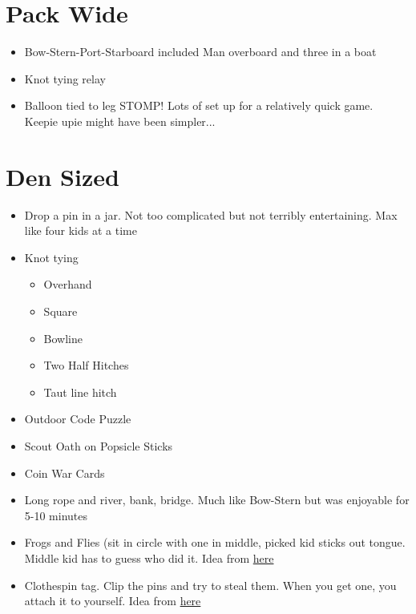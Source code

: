 \documentclass{exam}
\begin{document}
\section{Pack Wide}
\begin{itemize}
\item Bow-Stern-Port-Starboard included Man overboard and three in a boat
\item Knot tying relay
\item Balloon tied to leg STOMP!  Lots of set up for a relatively quick game.  Keepie upie might have been simpler...
\end{itemize}
\section{Den Sized}
\begin{itemize}
\item Drop a pin in a jar.  Not too complicated but not terribly entertaining.  Max like four kids at a time
\item Knot tying
\begin{itemize}
\item Overhand
\item Square
\item Bowline
\item Two Half Hitches
\item Taut line hitch
\end{itemize}
\item Outdoor Code Puzzle
\item Scout Oath on Popsicle Sticks
\item Coin War Cards
\item Long rope and river, bank, bridge.  Much like Bow-Stern but was enjoyable for 5-10 minutes
\item Frogs and Flies (sit in circle with one in middle, picked kid sticks out tongue.  Middle kid has to guess who did it.  Idea from \href{https://www.boyscouttrail.com/content/game/frogs\_and\_flies-521.asp}{here}
\item Clothespin tag.  Clip the pins and try to steal them.  When you get one, you attach it to yourself.  Idea from \href{https://www.boyscouttrail.com/content/game/clothespin\_tag-1465.asp}{here}
\end{itemize}
\end{document}

